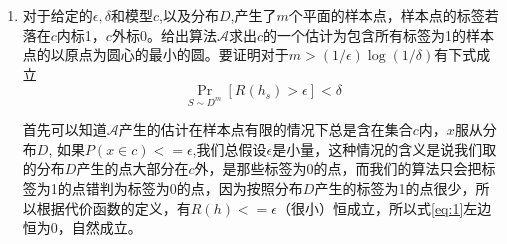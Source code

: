 \documentclass{article}
\begin{document}
\courseheader
{}
\begin{enumerate}
\item
\begin{solution}
对于给定的$\epsilon,\delta$和模型$c$,以及分布$D$,产生了$m$个平面的样本点，样本点的标签若落在$c$内标1，$c$外标0。给出算法$\mathcal{A}$求出$c$的一个估计为包含所有标签为1的样本点的以原点为圆心的最小的圆。要证明对于$m>(1/\epsilon)\log(1/\delta)$有下式成立
\begin{equation}\label{eq:1}
\Pr_{S\sim D^m} [R(h_s) > \epsilon]<\delta
\end{equation}


首先可以知道$\mathcal{A}$产生的估计在样本点有限的情况下总是含在集合$c$内，$x$服从分布$D$,
如果$P(x\in c)<=\epsilon$,我们总假设$\epsilon$是小量，这种情况的含义是说我们取的分布$D$产生的点大部分在$c$外，是那些标签为0的点，而我们的算法只会把标签为1的点错判为标签为0的点，因为按照分布$D$产生的标签为1的点很少，所以根据代价函数的定义，有$R(h)<=\epsilon$（很小）恒成立，所以式\eqref{eq:1}左边恒为0，自然成立。


\end{solution}
\end{enumerate}
\end{document}
